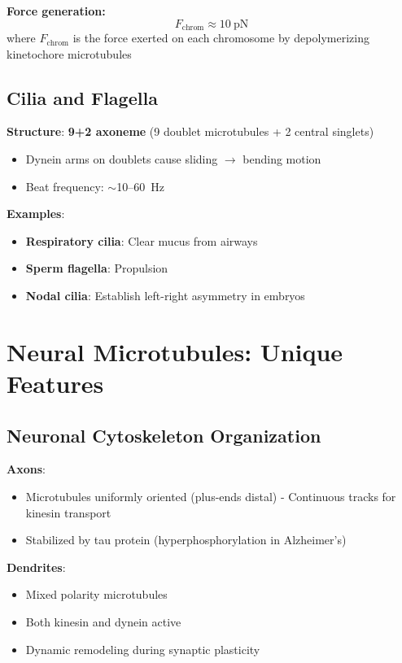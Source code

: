\textbf{Force generation:}
\begin{equation}
F_{\mathrm{chrom}} \approx 10\ \mathrm{pN}
\end{equation}
where $F_{\mathrm{chrom}}$ is the force exerted on each chromosome by depolymerizing kinetochore microtubules

\subsection{Cilia and Flagella}\label{cilia-and-flagella}

\textbf{Structure}: \textbf{9+2 axoneme} (9 doublet microtubules + 2 central singlets)
\begin{itemize}
\item Dynein arms on doublets cause sliding $\rightarrow$ bending motion
\item Beat frequency: $\sim$10--60~Hz
\end{itemize}

\textbf{Examples}:
\begin{itemize}
\item \textbf{Respiratory cilia}: Clear mucus from airways
\item \textbf{Sperm flagella}: Propulsion
\item \textbf{Nodal cilia}: Establish left-right asymmetry in embryos
\end{itemize}


\section{Neural Microtubules: Unique Features}
\label{sec:neural-microtubules}

\subsection{Neuronal Cytoskeleton
Organization}\label{neuronal-cytoskeleton-organization}

\textbf{Axons}:
\begin{itemize}
\item Microtubules uniformly oriented (plus-ends distal) -
Continuous tracks for kinesin transport
\item Stabilized by tau protein
(hyperphosphorylation in Alzheimer's)
\end{itemize}


\textbf{Dendrites}:
\begin{itemize}
\item Mixed polarity microtubules
\item Both kinesin and
dynein active
\item Dynamic remodeling during synaptic plasticity
\end{itemize}


